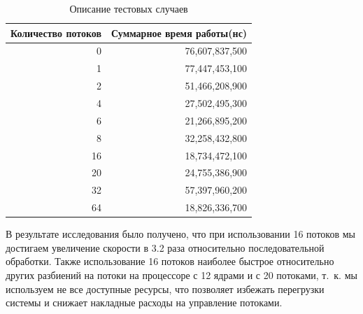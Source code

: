 \begin{table}[h]
    \begin{center}
        \begin{threeparttable}
    \caption{Описание тестовых случаев}
    \captionsetup{justification=raggedright, singlelinecheck=false}
    \label{tbl:mes}
    \begin{tabular}{|r|r|}
        \hline
        \textbf{Количество потоков} & \textbf{Суммарное время работы(нс)} \\
        \hline
        0 & 76,607,837,500 \\
        \hline
        1 & 77,447,453,100 \\
        \hline
        2 & 51,466,208,900 \\
        \hline
        4 & 27,502,495,300 \\
        \hline
        6 & 21,266,895,200 \\
        \hline
        8 & 32,258,432,800 \\
        \hline
        16 & 18,734,472,100 \\
        \hline
        20 & 24,755,386,900 \\
        \hline
        32 & 57,397,960,200 \\
        \hline
        64 & 18,826,336,700 \\
        \hline
    \end{tabular}
    \end{threeparttable}
    \end{center}
\end{table}

В результате исследования было получено, что при использовании 16 потоков мы достигаем увеличение скорости в 3.2 раза относительно последовательной обработки. Также использование 16 потоков наиболее быстрое относительно других разбиений на потоки на процессоре с 12 ядрами и с 20 потоками, т.~к. мы используем не все доступные ресурсы, что позволяет избежать перегрузки системы и снижает накладные расходы на управление потоками.

\clearpage